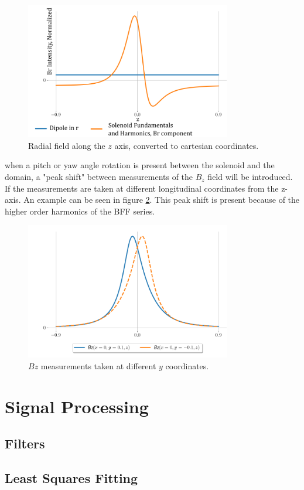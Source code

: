\begin{figure}[!h]
    \centering
    \includegraphics[width=0.8\textwidth]{figs/radialplot.png}
    \caption{Radial field along the $z$ axis, converted
    to cartesian coordinates.}
    \label{fig:radialplot}
\end{figure}

when a pitch or yaw angle rotation is present between the solenoid and 
the domain, a "peak shift" between measurements of the $B_z$
field will be introduced. If the measurements are taken at
different longitudinal coordinates from the z-axis. An 
example can be seen in figure \ref{fig:mirrored}. This 
peak shift is present because of the higher order harmonics
of the BFF series.

\begin{figure}[!h]
    \centering
    \includegraphics[width=0.8\textwidth]{figs/mirrored.png}
    \caption{$Bz$ measurements taken at different $y$ coordinates.}
    \label{fig:mirrored}
\end{figure}

\newpage
\section{Signal Processing}
\subsection{Filters}
\subsection{Least Squares Fitting}